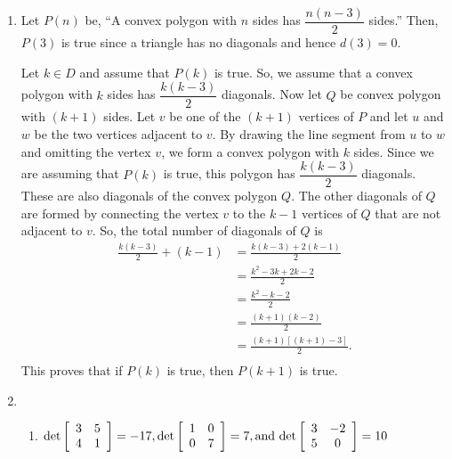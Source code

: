 \begin{enumerate}
\item Let $P ( n )$ be, ``A convex polygon with $n$ sides has $\dfrac{n ( n-3 )}{2}$ sides.''  Then, $P ( 3 )$ is true since a triangle has no diagonals and hence $d ( 3 ) = 0$.
  
Let  $k \in D$  and assume that $P ( k )$ is true.  So, we assume that a convex polygon with  $k$  sides has  $\dfrac{{k( {k - 3} )}}{2}$  diagonals.   Now let  $Q$  be convex polygon with  $( {k + 1} )$ sides.  Let  $v$  be one of the 
$( {k + 1} )$ vertices of $P$  and let  $u$  and  $w$  be the two vertices adjacent to  $v$.  By drawing the line segment from  $u$  to  $w$ and omitting the vertex  $v$, we form a convex polygon with  $k$  sides.  Since we are assuming that $P ( k )$ is true, this polygon has $\dfrac{{k( {k - 3} )}}{2}$  diagonals.  These are also diagonals of the convex polygon $Q$.  The other diagonals of $Q$ are formed by connecting the vertex  $v$ to the 
$k - 1$ vertices of $Q$ that are not adjacent to $v$.  So, the total number of diagonals of $Q$ is
\[
\begin{aligned}
\frac{{k( {k - 3} )}}{2} + ( k - 1 ) &= 
\frac{k ( k - 3 ) + 2 ( k - 1 )}{2} \\
  &= \frac{k^2 - 3k + 2k - 2}{2} \\
  &= \frac{k^2 - k - 2}{2} \\
  &= \frac{( k + 1 ) ( k - 2 )}{2} \\
  &= \frac{( k + 1 ) \left[ ( k + 1 ) - 3 \right]}{2}. \\
\end{aligned}
\]
This proves that if $P ( k )$ is true, then $P ( k + 1 )$ is true.

\item \begin{enumerate}
\item $\det \left[ {\begin{array}{*{20}c}
   3 & 5  \\
   4 & 1  \\
\end{array} } \right] =  - 17, \det \left[ {\begin{array}{*{20}c}
   1 & 0  \\
   0 & 7  \\
 \end{array} } \right] = 7, \text{and det}\left[ {\begin{array}{*{20}c}
   3 & { - 2}  \\
   5 & 0  \\
 \end{array} } \right] = 10$


\end{enumerate}
\end{enumerate}
